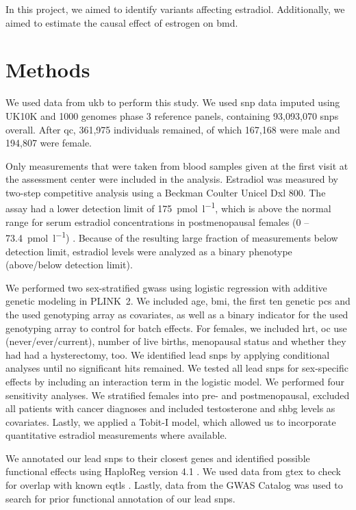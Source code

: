 \documentclass[twoside=false]{scrbook}
\begin{document}
In this project, we aimed to identify variants affecting estradiol.
Additionally, we aimed to estimate the causal effect of estrogen on \gls{bmd}.

\section{Methods} \label{sec:p1methods}
We used data from \gls{ukb} to perform this study.
We used \gls{snp} data imputed using UK10K and 1000 genomes phase 3 reference panels, containing 93,093,070 \glspl{snp} overall.
After \gls{qc}, 361,975 individuals remained, of which 167,168 were male and 194,807 were female.

Only measurements that were taken from blood samples given at the first visit at the assessment center were included in the analysis.
Estradiol was measured by two-step competitive analysis using a Beckman Coulter Unicel Dxl 800.
The assay had a lower detection limit of \qty{175}{\pmol\per\litre}, which is above the normal range for serum estradiol concentrations in postmenopausal females (0 -- \qty{73.4}{\pmol\per\litre}) \cite{Nakamoto2010a}.
Because of the resulting large fraction of measurements below detection limit, estradiol levels were analyzed as a binary phenotype (above/below detection limit).

We performed two sex-stratified \glspl{gwas} using logistic regression with additive genetic modeling in \textsf{PLINK~2}.
We included age, \gls{bmi}, the first ten genetic \glspl{pc} and the used genotyping array as covariates, as well as a binary indicator for the used genotyping array to control for batch effects.
For females, we included \gls{hrt}, \gls{oc} use (never/ever/current), number of live births, menopausal status and whether they had had a hysterectomy, too.
We identified lead \glspl{snp} by applying conditional analyses until no significant hits remained.
We tested all lead \glspl{snp} for sex-specific effects by including an interaction term in the logistic model.
We performed four sensitivity analyses.
We stratified females into pre- and postmenopausal, excluded all patients with cancer diagnoses and included testosterone and \gls{shbg} levels as covariates.
Lastly, we applied a Tobit-I model, which allowed us to incorporate quantitative estradiol measurements where available.

We annotated our lead \glspl{snp} to their closest genes and identified possible functional effects using \textsf{HaploReg} version 4.1 \cite{Ward2012}.
We used data from \gls{gtex} to check for overlap with known \glspl{eqtl} \cite{Carithers2015}.
Lastly, data from the GWAS Catalog was used to search for prior functional annotation of our lead \glspl{snp}.
\end{document}
